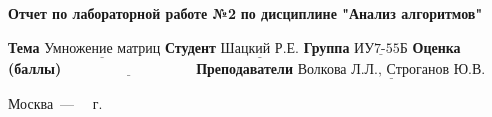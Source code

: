 \begin{titlepage}
	\begin{center}
		\noindent\begin{minipage}{1.3\textwidth}
					 \centering
					 \Large\textbf{  Отчет по лабораторной работе №2}\newline
					 \textbf{по дисциплине "Анализ алгоритмов"}\newline\newline
		\end{minipage}
	\end{center}

	\noindent\textbf{Тема} $\underline{\text{Умножение матриц}}$\newline\newline
	\noindent\textbf{Студент} $\underline{\text{Шацкий Р.Е.}}$\newline\newline
	\noindent\textbf{Группа} $\underline{\text{ИУ7-55Б}}$\newline\newline
	\noindent\textbf{Оценка (баллы)} $\underline{\text{~~~~~~~~~~~~~~~~~~~~~~~~~~~}}$\newline\newline
	\noindent\textbf{Преподаватели} $\underline{\text{Волкова Л.Л., Строганов Ю.В.}}$\newline\newline\newline

	\begin{center}
		\vfill
		Москва~---~\the\year
		~г.
	\end{center}
\end{titlepage}
